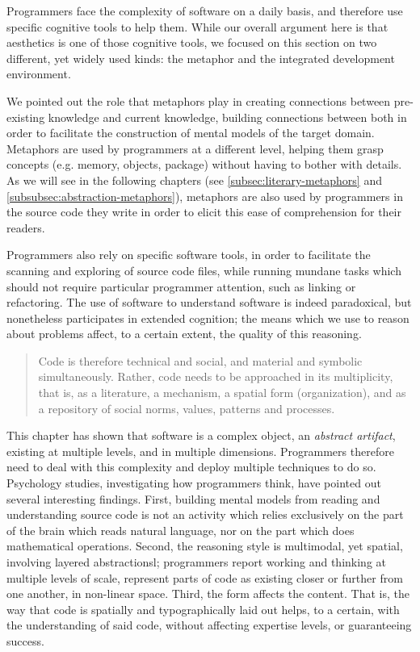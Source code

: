 \spacersmall

Programmers face the complexity of software on a daily basis, and therefore use specific cognitive tools to help them. While our overall argument here is that aesthetics is one of those cognitive tools, we focused on this section on two different, yet widely used kinds: the metaphor and the integrated development environment.

We pointed out the role that metaphors play in creating connections between pre-existing knowledge and current knowledge, building connections between both in order to facilitate the construction of mental models of the target domain. Metaphors are used by programmers at a different level, helping them grasp concepts (e.g. memory, objects, package) without having to bother with details. As we will see in the following chapters (see \autoref{subsec:literary-metaphors} and \autoref{subsubsec:abstraction-metaphors}), metaphors are also used by programmers in the source code they write in order to elicit this ease of comprehension for their readers.

Programmers also rely on specific software tools, in order to facilitate the scanning and  exploring of source code files, while running mundane tasks which should not require particular programmer attention, such as linking or refactoring. The use of software to understand software is indeed paradoxical, but nonetheless participates in extended cognition; the means which we use to reason about problems affect, to a certain extent, the quality of this reasoning.

\spacer

\begin{quote}
    Code is therefore technical and social, and material and symbolic simultaneously. Rather, code needs to be approached in its multiplicity, that is, as a literature, a mechanism, a spatial form (organization), and as a repository of social norms, values, patterns and processes. \citep{berry_philosophy_2011}
\end{quote}

This chapter has shown that software is a complex object, an \emph{abstract artifact}, existing at multiple levels, and in multiple dimensions. Programmers therefore need to deal with this complexity and deploy multiple techniques to do so. Psychology studies, investigating how programmers think, have pointed out several interesting findings. First, building mental models from reading and understanding source code is not an activity which relies exclusively on the part of the brain which reads natural language, nor on the part which does mathematical operations. Second, the reasoning style is multimodal, yet spatial, involving layered abstractionsl; programmers report working and thinking at multiple levels of scale, represent parts of code as existing closer or further from one another, in non-linear space. Third, the form affects the content. That is, the way that code is spatially and typographically laid out helps, to a certain, with the understanding of said code, without affecting expertise levels, or guaranteeing success.

